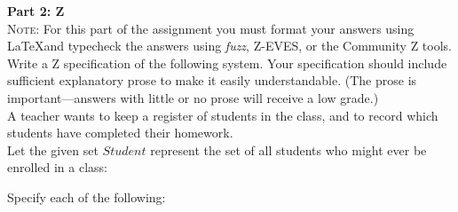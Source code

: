 \documentclass{article}
\begin{document}
\noindent \textbf{Part 2: Z} \\

\noindent \textsc{Note}: For this part of the assignment you must format your
answers using \LaTeX and typecheck the answers using {\em fuzz},  Z-EVES, or the Community Z tools.  \\

\noindent Write a Z specification of the following system. Your specification should include sufficient explanatory
prose to make it easily understandable. (The prose is important---answers with little
or no prose will receive a low grade.)\\[2ex]
A teacher wants to keep a register of students in the class, and to record which students have completed their homework. \\[2ex]
Let the given set $Student$ represent the set of all students who might ever be enrolled in a class: 
\begin{zed}
[Student]
\end{zed}
Specify each of the following:
\end{document}
